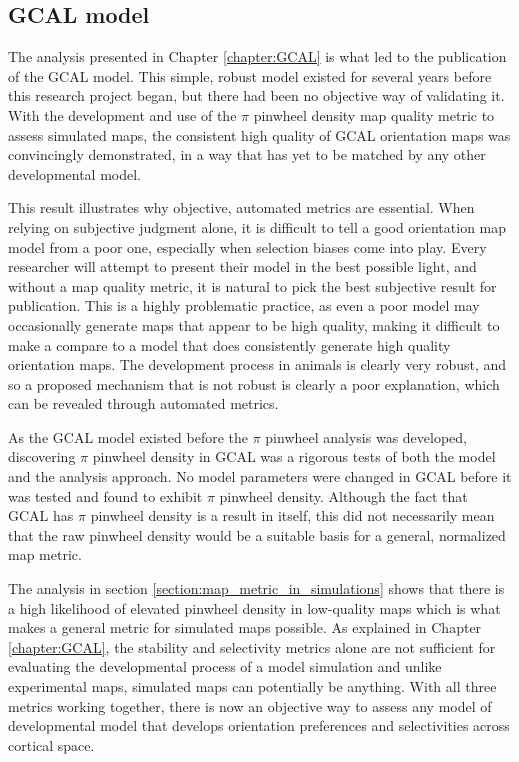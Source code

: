 \documentclass[phd,ianc,twoside]{infthesis}
\begin{document}
\subsection{GCAL model}

The analysis presented in Chapter \ref{chapter:GCAL} is what led to the
publication of the GCAL model. This simple, robust model existed for
several years before this research project began, but there had been no
objective way of validating it. With the development and use of the
$\pi$ pinwheel density map quality metric to assess simulated maps, the
consistent high quality of GCAL orientation maps was convincingly
demonstrated, in a way that has yet to be matched by any other
developmental model.

This result illustrates why objective, automated metrics are essential. When
relying on subjective judgment alone, it is difficult to tell a good
orientation map model from a poor one, especially when selection biases
come into play. Every researcher will attempt to present their model in
the best possible light, and without a map quality metric, it is natural
to pick the best subjective result for publication. This is a highly
problematic practice, as even a poor model may occasionally generate maps that
appear to be high quality, making it difficult to make a compare to
a model that does consistently generate high quality orientation
maps.  The development process in animals is clearly very robust, and
so a proposed mechanism that is not robust is clearly a poor
explanation, which can be revealed through automated metrics.

As the GCAL model existed before the $\pi$ pinwheel analysis was
developed, discovering $\pi$ pinwheel density in GCAL was a rigorous tests
of both the model and the analysis approach. No model parameters
were changed in GCAL before it was tested and found to exhibit $\pi$
pinwheel density.  Although the fact that GCAL has $\pi$ pinwheel density
is a result in itself, this did not necessarily mean that the raw pinwheel
density would be a suitable basis for a general, normalized map
metric.

The analysis in section \ref{section:map_metric_in_simulations} shows
that there is a high likelihood of elevated pinwheel density in low-quality maps which is what makes a
general metric for simulated maps possible.  As explained in Chapter \ref{chapter:GCAL},
the stability and selectivity metrics alone are not sufficient for
evaluating the developmental process of a model simulation and unlike
experimental maps, simulated maps can potentially be anything. With
all three metrics working together, there is now an objective way to
assess any model of developmental model that develops orientation
preferences and selectivities across cortical space. 
\end{document}
